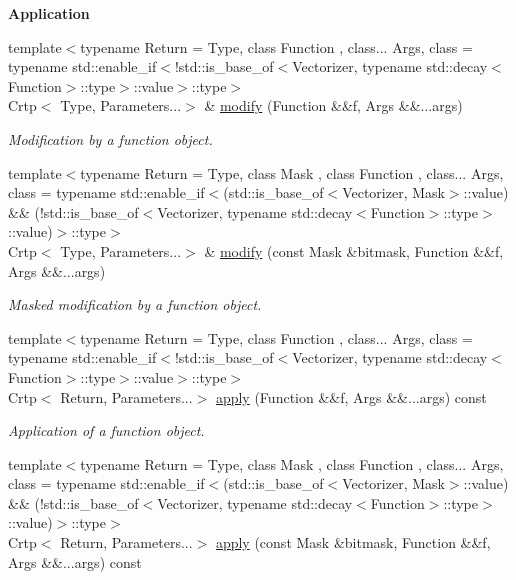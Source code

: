 \begin{Indent}{\bf Application}\par
\begin{DoxyCompactItemize}
\item 
{\footnotesize template$<$typename Return  = Type, class Function , class... Args, class  = typename std\-::enable\-\_\-if$<$!std\-::is\-\_\-base\-\_\-of$<$\-Vectorizer, typename std\-::decay$<$\-Function$>$\-::type$>$\-::value$>$\-::type$>$ }\\Crtp$<$ Type, Parameters...$>$ \& \hyperlink{classmagrathea_1_1StaticVectorizer_a3561a958f2f2e9335a75183752b06513}{modify} (Function \&\&f, Args \&\&...args)
\begin{DoxyCompactList}\small\item\em Modification by a function object. \end{DoxyCompactList}\item 
{\footnotesize template$<$typename Return  = Type, class Mask , class Function , class... Args, class  = typename std\-::enable\-\_\-if$<$(std\-::is\-\_\-base\-\_\-of$<$\-Vectorizer, Mask$>$\-::value) \&\& (!std\-::is\-\_\-base\-\_\-of$<$\-Vectorizer, typename std\-::decay$<$\-Function$>$\-::type$>$\-::value)$>$\-::type$>$ }\\Crtp$<$ Type, Parameters...$>$ \& \hyperlink{classmagrathea_1_1StaticVectorizer_ab491736cf47709fa98a58a2232662204}{modify} (const Mask \&bitmask, Function \&\&f, Args \&\&...args)
\begin{DoxyCompactList}\small\item\em Masked modification by a function object. \end{DoxyCompactList}\item 
{\footnotesize template$<$typename Return  = Type, class Function , class... Args, class  = typename std\-::enable\-\_\-if$<$!std\-::is\-\_\-base\-\_\-of$<$\-Vectorizer, typename std\-::decay$<$\-Function$>$\-::type$>$\-::value$>$\-::type$>$ }\\Crtp$<$ Return, Parameters...$>$ \hyperlink{classmagrathea_1_1StaticVectorizer_a9ba0cf8fddea6caac41800e7fc43889f}{apply} (Function \&\&f, Args \&\&...args) const 
\begin{DoxyCompactList}\small\item\em Application of a function object. \end{DoxyCompactList}\item 
{\footnotesize template$<$typename Return  = Type, class Mask , class Function , class... Args, class  = typename std\-::enable\-\_\-if$<$(std\-::is\-\_\-base\-\_\-of$<$\-Vectorizer, Mask$>$\-::value) \&\& (!std\-::is\-\_\-base\-\_\-of$<$\-Vectorizer, typename std\-::decay$<$\-Function$>$\-::type$>$\-::value)$>$\-::type$>$ }\\Crtp$<$ Return, Parameters...$>$ \hyperlink{classmagrathea_1_1StaticVectorizer_a68064fa87e05d4bb75e776c85afea35d}{apply} (const Mask \&bitmask, Function \&\&f, Args \&\&...args) const 

\end{DoxyCompactItemize}
\end{Indent}
